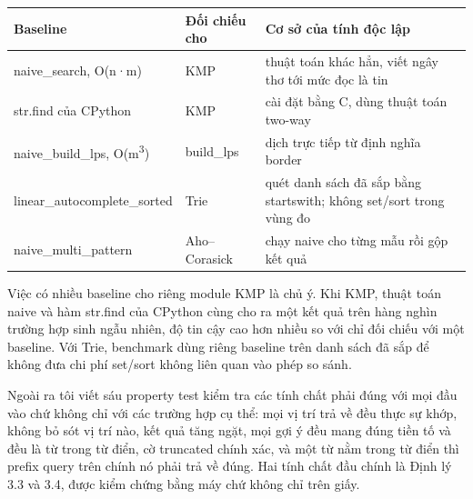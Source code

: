 {\footnotesize\singlespacing
\begin{longtable}[]{@{}
  >{\raggedright\arraybackslash}p{}
  >{\raggedright\arraybackslash}p{}
  >{\raggedright\arraybackslash}p{}@{}}
\toprule\noalign{}
\begin{minipage}[b]{\linewidth}\raggedright
Baseline
\end{minipage} & \begin{minipage}[b]{\linewidth}\raggedright
Đối chiếu cho
\end{minipage} & \begin{minipage}[b]{\linewidth}\raggedright
Cơ sở của tính độc lập
\end{minipage} \\
\midrule\noalign{}
\endhead
\bottomrule\noalign{}
\endlastfoot
naive\_search, O(n·m) & KMP & thuật toán khác hẳn, viết ngây thơ tới mức
đọc là tin \\
str.find của CPython & KMP & cài đặt bằng C, dùng thuật toán two-way
\cite{crochemore1991} \\
naive\_build\_lps, O(m\textsuperscript{3}) & build\_lps & dịch trực tiếp từ định nghĩa
border \\
linear\_autocomplete\_sorted & Trie & quét danh sách đã sắp bằng
startswith; không set/sort trong vùng đo \\
naive\_multi\_pattern & Aho--Corasick & chạy naive cho từng mẫu rồi gộp
kết quả \\
\end{longtable}
}

Việc có nhiều baseline cho riêng module KMP là chủ ý. Khi KMP, thuật
toán naive và hàm str.find của CPython cùng cho ra một kết quả trên hàng
nghìn trường hợp sinh ngẫu nhiên, độ tin cậy cao hơn nhiều so với chỉ
đối chiếu với một baseline. Với Trie, benchmark dùng riêng baseline trên
danh sách đã sắp để không đưa chi phí set/sort không liên quan vào phép
so sánh.

Ngoài ra tôi viết sáu property test kiểm tra các tính chất phải đúng với
mọi đầu vào chứ không chỉ với các trường hợp cụ thể: mọi vị trí trả về
đều thực sự khớp, không bỏ sót vị trí nào, kết quả tăng ngặt, mọi gợi ý
đều mang đúng tiền tố và đều là từ trong từ điển, cờ truncated chính
xác, và một từ nằm trong từ điển thì prefix query trên chính nó phải trả
về đúng. Hai tính chất đầu chính là Định lý 3.3 và 3.4, được kiểm chứng
bằng máy chứ không chỉ trên giấy.

